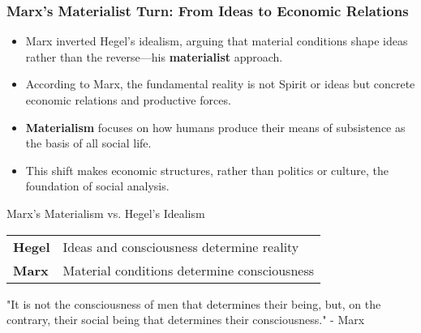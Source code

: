 \documentclass{beamer}
\begin{document}
    
\begin{frame}
\frametitle{Marx's Materialist Turn: From Ideas to Economic Relations}
\begin{itemize}
    \item Marx inverted Hegel's idealism, arguing that material conditions shape ideas rather than the reverse—his \textbf{materialist} approach.
    \item According to Marx, the fundamental reality is not Spirit or ideas but concrete economic relations and productive forces.
    \item \textbf{Materialism} focuses on how humans produce their means of subsistence as the basis of all social life.
    \item This shift makes economic structures, rather than politics or culture, the foundation of social analysis.
\end{itemize}

\begin{exampleblock}{Marx's Materialism vs. Hegel's Idealism}
\begin{center}
\begin{tabular}{ll}
\textbf{Hegel} & Ideas and consciousness determine reality \\
\textbf{Marx} & Material conditions determine consciousness \\
\end{tabular}
\end{center}
"It is not the consciousness of men that determines their being, but, on the contrary, their social being that determines their consciousness." - Marx
\end{exampleblock}
\end{frame}
\end{document}
